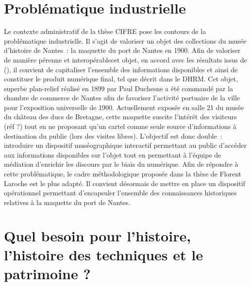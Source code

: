 \documentclass[a4paper,11pt,french]{article}
\begin{document}
\section{Problématique industrielle}

Le contexte administratif de la thèse CIFRE pose les contours de la problématique industrielle. Il s'agit de valoriser un objet des collections du musée d'histoire de Nantes~: la maquette du port de Nantes en 1900. Afin de valoriser de manière pérenne et interopérablecet objet, en accord avec les résultats issus de (), il convient de capitaliser l'ensemble des informations disponibles et ainsi de constituer le produit numérique final, tel que décrit dans le DHRM.
Cet objet, superbe plan-relief réalisé en 1899 par Paul Duchesne a été commandé par la chambre de commerce de Nantes afin de favoriser l'activité portuaire de la ville pour l'exposition universelle de 1900\cite{GuilletB1999, Naegel2011}. Actuellement exposée en salle 21 du musée du château des ducs de Bretagne, cette maquette suscite l'intérêt des visiteurs (réf ?) tout en ne proposant qu'un cartel comme seule source d'informations à destination du public (lors des visites libres). L'objectif est donc double~: introduire un dispositif muséographique interactif permettant au public d'accéder aux informations disponibles sur l'objet tout en permettant à l'équipe de médiation d'enrichir les discours par le biais du numérique.
Afin de répondre à cette problématique, le cadre méthodologique proposée dans la thèse de Florent Laroche est le plus adapté. Il convient désormais de mettre en place un dispositif opérationnel permettant d'encapsuler l'ensemble des connaissances historiques relatives à la maquette du port de Nantes.

\section{Quel besoin pour l'histoire, l'histoire des techniques et le patrimoine ?}
\end{document}
